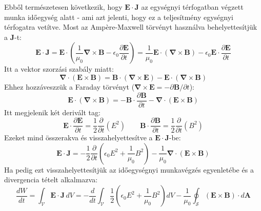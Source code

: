 \documentclass[../main.tex]{subfiles}
\begin{document}
Ebből természetesen következik, hogy $\mathbf{E} \cdot \mathbf{J}$ az egységnyi térfogatban végzett munka időegység alatt - ami azt jelenti, hogy ez a teljesítmény egységnyi térfogatra vetítve.
Most az Ampère-Maxwell törvényt használva behelyettesítjük a $\mathbf{J}$-t:
\begin{equation}
    \mathbf{E} \cdot \mathbf{J} = \mathbf{E} \cdot \left( \frac{1}{\mu_0} \boldsymbol{\nabla} \times \mathbf{B} - \epsilon_0 \frac{\partial \mathbf{E}}{\partial t} \right) = \frac{1}{\mu_0} \mathbf{E} \cdot (\boldsymbol{\nabla} \times \mathbf{B}) - \epsilon_0 \mathbf{E} \cdot \frac{\partial \mathbf{E}}{\partial t}
\end{equation}
Itt a vektor szorzási szabály miatt:
\begin{equation}
    \boldsymbol{\nabla} \cdot (\mathbf{E} \times \mathbf{B}) = \mathbf{B} \cdot (\boldsymbol{\nabla} \times \mathbf{E}) - \mathbf{E} \cdot (\boldsymbol{\nabla} \times \mathbf{B})
\end{equation}
Ehhez hozzáveszzük a Faraday törvényt ($\boldsymbol{\nabla} \times \mathbf{E} = - \partial \mathbf{B} / \partial t$):
\begin{equation}
    \mathbf{E} \cdot (\boldsymbol{\nabla} \times \mathbf{B}) = - \mathbf{B} \cdot \frac{\partial \mathbf{B}}{\partial t} - \boldsymbol{\nabla} \cdot (\mathbf{E} \times \mathbf{B})
\end{equation}
Itt megjelenik két derivált tag:
\begin{equation}
    \mathbf{E} \cdot \frac{\partial \mathbf{E}}{\partial t} = \frac{1}{2} \frac{\partial }{\partial t} (E^2) \qquad \mathbf{B} \cdot \frac{\partial \mathbf{B}}{\partial t} = \frac{1}{2} \frac{\partial }{\partial t} (B^2)
\end{equation}
Ezeket mind összerakva és visszahelyettesítve a $\mathbf{E} \cdot \mathbf{J}$-be:
\begin{equation}
    \mathbf{E} \cdot \mathbf{J} = - \frac{1}{2} \frac{\partial}{\partial t} \left( \epsilon_0 E^2 + \frac{1}{\mu_0} B^2 \right) - \frac{1}{\mu_0} \boldsymbol{\nabla} \cdot (\mathbf{E} \times \mathbf{B})
\end{equation}
Ha pedig ezt visszahelyettesítjük az időegységnyi munkavégzés egyenletébe és a divergencia tételt alkalmazva:
\begin{equation}
    \frac{dW}{dt} = \int_{\mathcal{V}} \mathbf{E} \cdot \mathbf{J} \, dV = - \frac{d}{dt} \int_{\mathcal{V}} \frac{1}{2} \left( \epsilon_0 E^2 + \frac{1}{\mu_0} B^2 \right) dV - \frac{1}{\mu_0} \oint_{\mathcal{S}} (\mathbf{E} \times \mathbf{B}) \cdot d\mathbf{A}
\end{equation}
\end{document}
